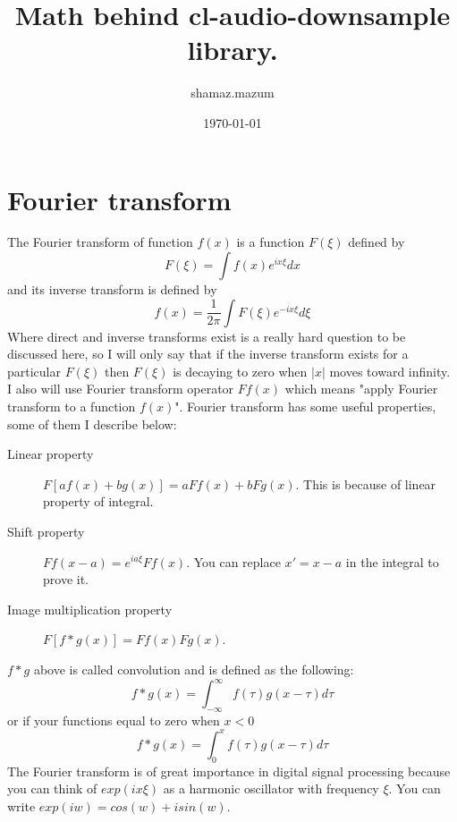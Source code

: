 \documentclass[a4paper,11pt,fleqn]{article}
\date{\today}
\author{shamaz.mazum}
\title{Math behind cl-audio-downsample library.}
\begin{document}
\maketitle
\section{Fourier transform}
The Fourier transform of function $f(x)$ is a function $F(\xi)$ defined by
\begin{equation}
F(\xi) = \int f(x)e^{ix\xi}dx
\end{equation}
and its inverse transform is defined by 
\begin{equation}
f(x) = \frac{1}{2\pi}\int F(\xi)e^{-ix\xi}d\xi
\end{equation}
Where direct and inverse transforms exist is a really hard question to be discussed here, so I will only say
that if the inverse transform exists for a particular $F(\xi)$ then $F(\xi)$ is decaying to zero when 
$\left|x\right|$ moves toward infinity.
I also will use Fourier transform operator $Ff(x)$ which means "apply Fourier transform to a function $f(x)$".
Fourier transform has some useful properties, some of them I describe below:
\begin{description}
\item[Linear property] $F[af(x)+bg(x)] = aFf(x) + bFg(x)$. This is because of linear property of integral.
\item[Shift property] $Ff(x-a) = e^{ia\xi}Ff(x)$. You can replace $x' = x - a$ in the integral to prove it.
\item[Image multiplication property] $F[f*g(x)] = Ff(x)Fg(x)$.
\end{description}
$f*g$ above is called convolution and is defined as the following:
\begin{equation}
f*g(x) = \int_{-\infty}^{\infty}f(\tau)g(x-\tau)d\tau
\end{equation}
or if your functions equal to zero when $x<0$ 
\begin{equation} \label{convolve2}
f*g(x) = \int_{0}^{x}f(\tau)g(x-\tau)d\tau
\end{equation}
The Fourier transform is of great importance in digital signal processing because you can think of $exp(ix\xi)$
as a harmonic oscillator with frequency $\xi$. You can write $exp(iw) = cos(w) + isin(w)$.
\end{document}
